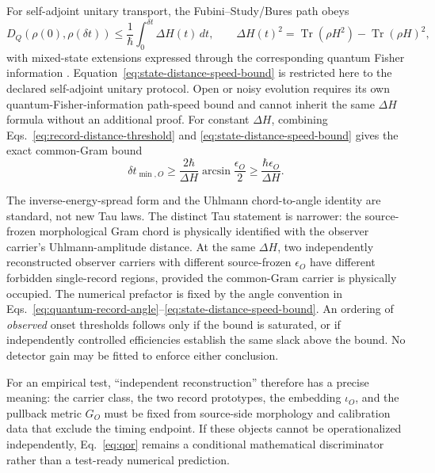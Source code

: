 \documentclass[11pt]{article}
\begin{document}
For self-adjoint unitary transport, the Fubini--Study/Bures path obeys
\begin{equation}
  D_Q(\rho(0),\rho(\delta t))
  \leq\frac{1}{\hbar}\int_0^{\delta t}\!\Delta H(t)\,dt,
  \qquad
  \Delta H(t)^2=\operatorname{Tr}(\rho H^2)-
  \operatorname{Tr}(\rho H)^2,
  \label{eq:state-distance-speed-bound}
\end{equation}
with mixed-state extensions expressed through the corresponding quantum Fisher
information \cite{MandelstamTamm1945,AnandanAharonov1990,Taddei2013}.
Equation~\eqref{eq:state-distance-speed-bound} is restricted here to the
declared self-adjoint unitary protocol.  Open or noisy evolution requires its
own quantum-Fisher-information path-speed bound and cannot inherit the same
\(\Delta H\) formula without an additional proof.
For constant \(\Delta H\), combining Eqs.~\eqref{eq:record-distance-threshold}
and \eqref{eq:state-distance-speed-bound} gives the exact common-Gram bound
\begin{equation}
  \boxed{
  \delta t_{\min,O}\geq
  \frac{2\hbar}{\Delta H}\arcsin\frac{\epsilon_O}{2}
  \geq\frac{\hbar\epsilon_O}{\Delta H}.}
  \label{eq:qor}
\end{equation}

The inverse-energy-spread form and the Uhlmann chord-to-angle identity are
standard, not new Tau laws.  The distinct Tau statement is narrower: the
source-frozen morphological Gram chord is physically identified with the
observer carrier's Uhlmann-amplitude distance.  At the same
\(\Delta H\), two independently reconstructed observer carriers with
different source-frozen \(\epsilon_O\) have different forbidden
single-record regions, provided the common-Gram carrier is physically
occupied.  The numerical prefactor is fixed by the angle convention in
Eqs.~\eqref{eq:quantum-record-angle}--\eqref{eq:state-distance-speed-bound}.
An ordering of \emph{observed} onset thresholds follows
only if the bound is saturated, or if independently controlled efficiencies
establish the same slack above the bound.  No detector gain may be fitted to
enforce either conclusion.

For an empirical test, ``independent reconstruction'' therefore has a precise
meaning: the carrier class, the two record prototypes, the embedding
\(\iota_O\), and the pullback metric \(G_O\) must be fixed from source-side
morphology and calibration data that exclude the timing endpoint.  If these
objects cannot be operationalized independently, Eq.~\eqref{eq:qor} remains a
conditional mathematical discriminator rather than a test-ready numerical
prediction.
\end{document}
